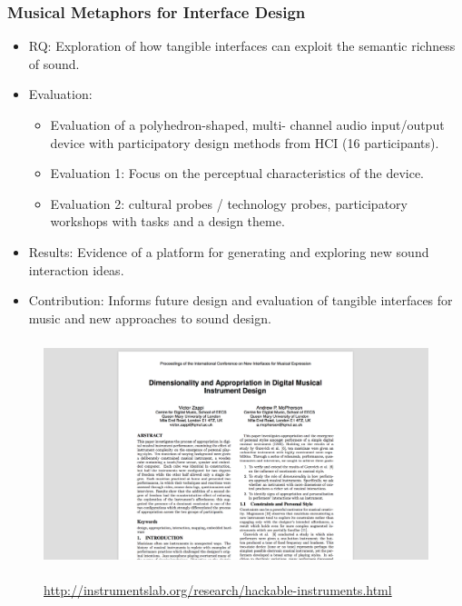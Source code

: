 \documentclass[screen, aspectratio=169]{beamer}
\begin{document}
%
\begin{frame}
\frametitle{Musical Metaphors for Interface Design}	
\begin{itemize}
\item RQ: Exploration of how tangible interfaces can exploit the semantic richness of sound.
\item Evaluation:
\begin{itemize}
\item Evaluation of a polyhedron-shaped, multi- channel audio input/output device with participatory design methods from HCI (16 participants).
\item Evaluation 1: Focus on the perceptual characteristics of the device.
\item Evaluation 2: cultural probes / technology probes, participatory workshops with tasks and a design theme.
\end{itemize}
\item Results: Evidence of a platform for generating and exploring new sound interaction ideas.
\item Contribution: Informs future design and evaluation of tangible interfaces for music and new approaches to sound design.
\end{itemize}
\end{frame}
%
\begin{frame}
\frametitle{}
\begin{figure}
	\includegraphics[scale=0.31]{img/Zappi-McPherson-2014.png}\\
	    \cite{Zappi.McPherson.2014.NIME}\\
	       {\scriptsize  \url{http://instrumentslab.org/research/hackable-instruments.html}}
    \end{figure}		
\end{frame}
%
\end{document}
